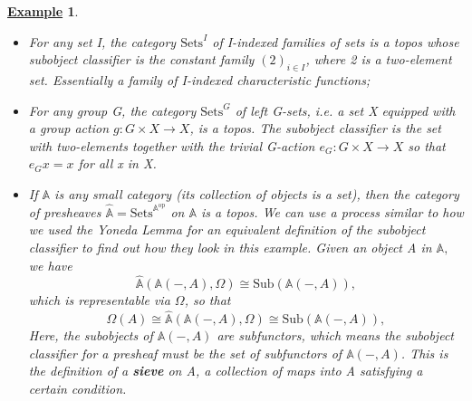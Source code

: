 \documentclass{article}
\newtheorem{example}{\underline{Example}}
\begin{document}
\begin{example}
	\begin{itemize}
		\item[1)] For any set I, the category \(\mathrm{Sets}^{I}\) of I-indexed families of sets is a topos whose subobject classifier is the constant family \((2)_{i\in I}\), where 2 is a two-element set. Essentially a family of I-indexed characteristic functions;
		\item[2)] For any group G, the category \(\mathrm{Sets}^{G}\) of left G-sets, \textit{i.e.} a set X equipped with a group action \(g:G\times X\rightarrow X \), is a topos. The subobject classifier is the set with two-elements together with the trivial G-action \(e_{G}:G\times X\rightarrow X\) so that \(e_{G}x = x\) for all x in X.
		\item[3)] If \(\mathbb{A}\) is any \textit{small category} (its collection of objects is a set), then the category of presheaves \(\hat{\mathbb{A}}=\mathrm{Sets}^{\mathbb{A}^{\mathrm{op}}}\) on \(\mathbb{A}\) is a topos. We can use a process similar to how we used the Yoneda Lemma for an equivalent definition of the subobject classifier to find out how they look in this example. Given an object A in \(\mathbb{A},\) we have
		      \[
			      \hat{\mathbb{A}}(\mathbb{A}(-, A), \Omega )\cong \mathrm{Sub}(\mathbb{A}(-, A)),
		      \]
		      which is representable via \(\Omega \), so that
		      \[
			      \Omega(A)\cong \hat{\mathbb{A}}(\mathbb{A}(-, A), \Omega )\cong \mathrm{Sub}(\mathbb{A}(-, A)),
		      \]
		      Here, the subobjects of \(\mathbb{A}(-, A)\) are subfunctors, which means the subobject classifier for a presheaf must be the set of subfunctors of \(\mathbb{A}(-, A)\). This is the definition of a \textbf{sieve} on A, a collection of maps into A satisfying a certain condition.
	\end{itemize}
\end{example}
\end{document}
